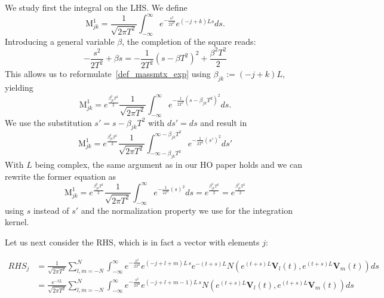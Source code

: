 \documentclass[a4,12pt]{article}
\newcommand{\V}{\mathbf{V}}
\newcommand{\M}{\mathrm{M}}
\begin{document}
 We study first the integral on the LHS. We define
 \begin{equation}\label{def_massmtx_exp}
  \M^1_{jk}  = \frac{1}{\sqrt{2\pi T^2}}\int_{-\infty}^\infty e^{-\frac{s^2}{2T^2}}  e^{(-j+k)Ls}  ds  . 
 \end{equation}
 Introducing a general variable $\beta$, the completion of the square reads:
 \[
 -\frac{s^2}{2T^2} + \beta s =     - \frac{1}{2T^2} (s - \beta T^2)^2 + \frac{\beta^2 T^2}{2}  
 \]
 This allows us to reformulate~\eqref{def_massmtx_exp} using $\beta_{jk} := (-j+k)L$, yielding 
 \begin{equation}\label{def_massmtx_exp1}
  \M^1_{jk}  = e^{\frac{\beta_{jk}^2T^2}{2}}\frac{1}{\sqrt{2\pi T^2}}\int_{-\infty}^\infty 
  e^{- \frac{1}{2T^2} (s - \beta_{jk} T^2)^2} ds   .
 \end{equation}
 We use the substitution $s' = s - \beta_{jk} T^2$ with $ds' = ds$ and result in
 \begin{equation}\label{def_massmtx_exp2}
  \M^1_{jk}  = e^{\frac{\beta_{jk}^2T^2}{2}}\frac{1}{\sqrt{2\pi T^2}}\int_{-\infty-\beta_{jk} T^2}^{\infty-\beta_{jk} T^2} 
  e^{- \frac{1}{2T^2} (s')^2} ds'   
 \end{equation}
  With $L$ being complex, the same argument as in our HO paper holds and we can rewrite the former equation 
 as 
\begin{equation}\label{def_massmtx_exp3}
  \M^1_{jk}  = e^{\frac{\beta_{jk}^2T^2}{2}}\frac{1}{\sqrt{2\pi T^2}}\int_{-\infty }^{\infty } 
  e^{- \frac{1}{2T^2} (s)^2} ds   =  e^{\frac{\beta_{jk}^2T^2}{2}}
  = e^{\frac{\beta_{jk}^2T^2}{2}}
 \end{equation}
 using $s$ instead of $s'$ and the normalization property we use for the integration kernel.
 
 \bigskip
 
 
 Let us next consider the RHS, which is in fact a vector with elements $j$: 
 
 \begin{align*}
RHS_j &  = \frac{1}{\sqrt{2\pi T^2}} \sum_{l,m =-N}^{N}  \int_{-\infty}^{\infty} 
     {e^{-\frac{s^2}{2T^2}}}  
 e^{(-j+l+m)L \, s} 
 e^{-(t+s) L} N \left(e^{ (t+s) L}  {\V_l}(t), e^{ (t+s) L} {\V_m}(t)\right) ds   \\
&  = \frac{e^{- t L}}{\sqrt{2\pi T^2}} \sum_{l,m =-N}^{N}  \int_{-\infty}^{\infty} 
     {e^{-\frac{s^2}{2T^2}}} e^{(-j+l+m - 1)L \, s}  
 N \left(e^{ (t+s) L}  {\V_l}(t), e^{ (t+s) L} {\V_m}(t)\right) ds   \\
\end{align*}
\end{document}
